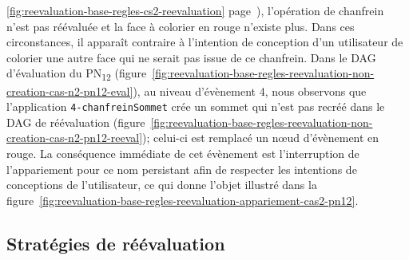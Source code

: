 \ref{fig:reevaluation-base-regles-cs2-reevaluation}
page~\pageref{fig:reevaluation-base-regles-cs2-reevaluation}), l'opération de
chanfrein n'est pas réévaluée et la face à colorier en rouge n'existe plus. %
Dans ces circonstances, il apparaît contraire à l'intention de conception d'un
utilisateur de colorier une autre face qui ne serait pas issue de ce
chanfrein. %
Dans le DAG d'évaluation du PN\textsubscript{12}
(figure~\ref{fig:reevaluation-base-regles-reevaluation-non-creation-cas-n2-pn12-eval}),
au niveau d'évènement 4, nous observons que l'application
\texttt{4-\allowbreak{}chanfrein\-Sommet} crée un sommet qui n'est pas recréé dans le DAG de
réévaluation
(figure~\ref{fig:reevaluation-base-regles-reevaluation-non-creation-cas-n2-pn12-reeval});
celui-ci est remplacé un n\oe ud d'évènement \nocreationnodeevent[red]{} en
	{\color{red}rouge}. %
La conséquence immédiate de cet évènement est l'interruption de l'appariement
pour ce nom persistant afin de respecter les intentions de conceptions de
l'utilisateur, ce qui donne l'objet illustré dans la
figure~\ref{fig:reevaluation-base-regles-reevaluation-appariement-cas2-pn12}. %



\subsection{Stratégies de réévaluation}
\label{sec:reevaluation-base-regles-reevaluation-strategies}


